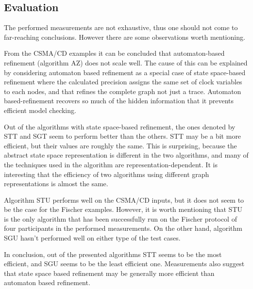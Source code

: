 \subsection{Evaluation}

The performed measurements are not exhaustive, thus one should not come to far-reaching conclusions. However there are some observations worth mentioning.

From the CSMA/CD examples it can be concluded that automaton-based refinement (algorithm AZ) does not scale well. The cause of this can be explained by considering automaton based refinement as a special case of state space-based refinement where the calculated precision assigns the same set of clock variables to each nodes, and that refines the complete graph not just a trace. Automaton based-refinement recovers so much of the hidden information that it prevents efficient model checking.

Out of the algorithms with state space-based refinement, the ones denoted by STT and SGT seem to perform better than the others. STT may be a bit more efficient, but their values are roughly the same. This is surprising, because the abstract state space representation is different in the two algorithms, and many of the techniques used in the algorithm are representation-dependent. It is interesting that the efficiency of two algorithms using different graph representations is almost the same.

Algorithm STU performs well on the CSMA/CD inputs, but it does not seem to be the case for the Fischer examples. However, it is worth mentioning that STU is the only algorithm that has been successfully run on the Fischer protocol of four participants in the performed measurements. On the other hand, algorithm SGU hasn't performed well on either type of the test cases.

In conclusion, out of the presented algorithms STT seems to be the most efficient, and SGU seems to be the least efficient one. Measurements also suggest that state space based refinement may be generally more efficient than automaton based refinement.




